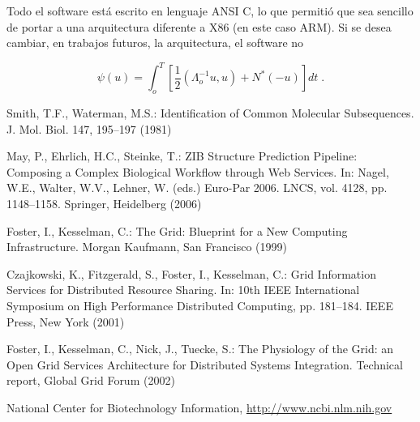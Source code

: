 \documentclass[runningheads,a4paper]{llncs}
\begin{document}
Todo el software está escrito en lenguaje ANSI C, lo que permitió que
sea sencillo de portar a una arquitectura diferente a X86 (en este caso ARM).
Si se desea cambiar, en trabajos futuros, la arquitectura, el software no

\begin{equation}
  \psi (u) = \int_{o}^{T} \left[\frac{1}{2}
  \left(\Lambda_{o}^{-1} u,u\right) + N^{\ast} (-u)\right] dt \;  .
\end{equation}



\begin{thebibliography}{4}

 Smith, T.F., Waterman, M.S.: Identification of Common Molecular
Subsequences. J. Mol. Biol. 147, 195--197 (1981)

 May, P., Ehrlich, H.C., Steinke, T.: ZIB Structure Prediction Pipeline:
Composing a Complex Biological Workflow through Web Services. In: Nagel,
W.E., Walter, W.V., Lehner, W. (eds.) Euro-Par 2006. LNCS, vol. 4128,
pp. 1148--1158. Springer, Heidelberg (2006)

 Foster, I., Kesselman, C.: The Grid: Blueprint for a New Computing
Infrastructure. Morgan Kaufmann, San Francisco (1999)

 Czajkowski, K., Fitzgerald, S., Foster, I., Kesselman, C.: Grid
Information Services for Distributed Resource Sharing. In: 10th IEEE
International Symposium on High Performance Distributed Computing, pp.
181--184. IEEE Press, New York (2001)

 Foster, I., Kesselman, C., Nick, J., Tuecke, S.: The Physiology of the
Grid: an Open Grid Services Architecture for Distributed Systems
Integration. Technical report, Global Grid Forum (2002)

 National Center for Biotechnology Information, \url{http://www.ncbi.nlm.nih.gov}

\end{thebibliography}
\end{document}
